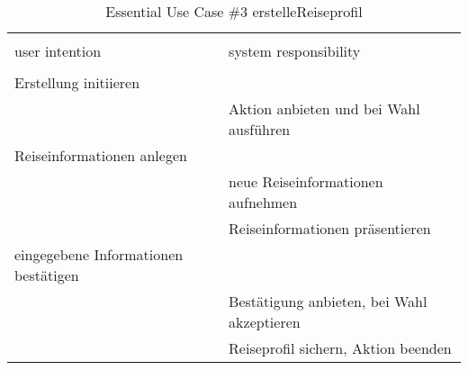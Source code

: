 \begin{table}[H]
\caption{Essential Use Case \#3 erstelleReiseprofil }
\centering
\begin{tabular}{l l}
\\ [-0.5ex]

\hline\hline
\\ [-0.5ex]
user intention & system responsibility
\\ [1.5ex]
\hline
\\ [-0.5ex]
Erstellung initiieren      &                                 \\[1ex]
                     & Aktion anbieten und bei Wahl ausführen   \\[1ex]
Reiseinformationen anlegen    &                                 \\[1ex] 
                     & neue Reiseinformationen aufnehmen        \\[1ex]
                     & Reiseinformationen präsentieren          \\[1ex]
eingegebene Informationen bestätigen   &                                 \\[1ex]
                     & Bestätigung anbieten, bei Wahl akzeptieren \\[1ex]
                     & Reiseprofil sichern, Aktion beenden      \\[1ex]

\hline
\end{tabular}
\label{tab:reiseprofil}
\end{table}

